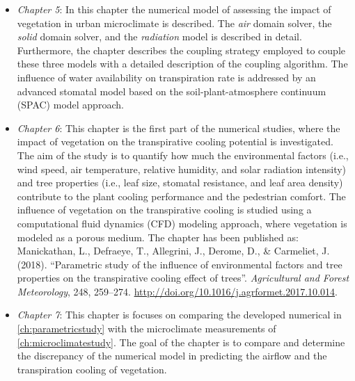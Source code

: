 \begin{itemize}
	\item \textit{Chapter 5}: In this chapter the numerical model of assessing the impact of vegetation in urban microclimate is described. The \textit{air} domain solver, the \textit{solid} domain solver, and the \textit{radiation} model is described in detail. Furthermore, the chapter describes the coupling strategy employed to couple these three models with a detailed description of the coupling algorithm. The influence of water availability on transpiration rate is addressed by an advanced stomatal model based on the soil-plant-atmosphere continuum (SPAC) model approach. 

	\item \textit{Chapter 6}: This chapter is the first part of the numerical studies, where the impact of vegetation on the transpirative cooling potential is investigated. The aim of the study is to quantify how much the environmental factors (i.e., wind speed, air temperature, relative humidity, and solar radiation intensity) and tree properties (i.e., leaf size, stomatal resistance, and leaf area density) contribute to the plant cooling performance and the pedestrian comfort. The influence of vegetation on the transpirative cooling is studied using a computational fluid dynamics (CFD) modeling approach, where vegetation is modeled as a porous medium.  The chapter has been published as: Manickathan, L., Defraeye, T., Allegrini, J., Derome, D., \& Carmeliet, J. (2018). ``Parametric study of the influence of environmental factors and tree properties on the transpirative cooling effect of trees''. \textit{Agricultural and Forest Meteorology}, 248, 259–274. \url{http://doi.org/10.1016/j.agrformet.2017.10.014}.

	\item \textit{Chapter 7}: This chapter is focuses on comparing the developed numerical in \cref{ch:parametricstudy} with the microclimate measurements of \cref{ch:microclimatestudy}. The goal of the chapter is to compare and determine the discrepancy of the numerical model in predicting the airflow and the transpiration cooling of vegetation.  


\end{itemize}
